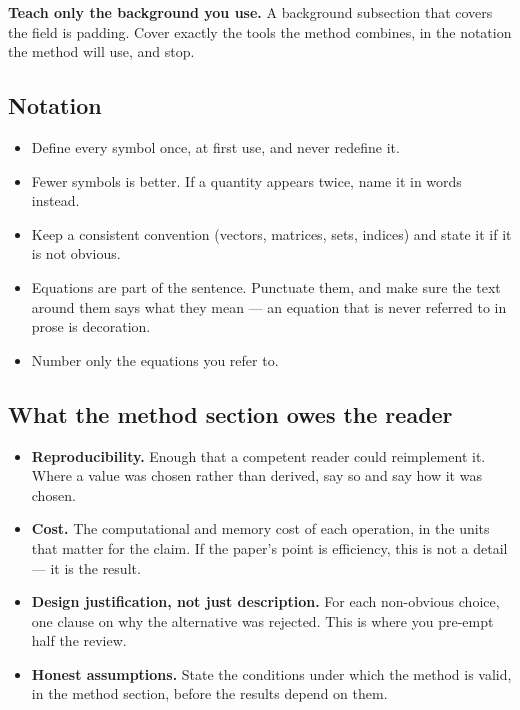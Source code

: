 \documentclass[11pt,a4paper]{article}
\newcommand{\lead}[1]{\medskip\noindent\textbf{#1}\quad}
\begin{document}
\lead{Teach only the background you use.} A background subsection that covers
the field is padding. Cover exactly the tools the method combines, in the
notation the method will use, and stop.

\subsection*{Notation}

\begin{itemize}
  \item Define every symbol once, at first use, and never redefine it.
  \item Fewer symbols is better. If a quantity appears twice, name it in
    words instead.
  \item Keep a consistent convention (vectors, matrices, sets, indices) and
    state it if it is not obvious.
  \item Equations are part of the sentence. Punctuate them, and make sure the
    text around them says what they mean --- an equation that is never
    referred to in prose is decoration.
  \item Number only the equations you refer to.
\end{itemize}

\subsection*{What the method section owes the reader}

\begin{itemize}
  \item \textbf{Reproducibility.} Enough that a competent reader could
    reimplement it. Where a value was chosen rather than derived, say so and
    say how it was chosen.
  \item \textbf{Cost.} The computational and memory cost of each operation,
    in the units that matter for the claim. If the paper's point is
    efficiency, this is not a detail --- it is the result.
  \item \textbf{Design justification, not just description.} For each
    non-obvious choice, one clause on why the alternative was rejected. This
    is where you pre-empt half the review.
  \item \textbf{Honest assumptions.} State the conditions under which the
    method is valid, in the method section, before the results depend on them.
\end{itemize}
\end{document}
